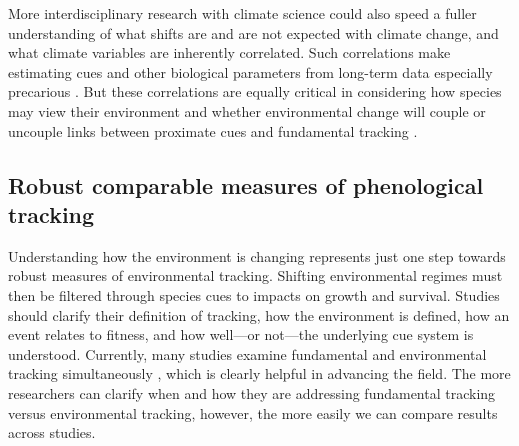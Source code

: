 \documentclass[11pt,letterpaper]{article}
\begin{document}
More interdisciplinary research with climate science could also speed a fuller understanding of what shifts are and are not expected with climate change, and what climate variables are inherently correlated. Such correlations make estimating cues and other biological parameters from long-term data especially precarious \citep{tansey2017}. But these correlations are equally critical in considering how species may view their environment and whether environmental change will couple or uncouple links between proximate cues and fundamental tracking \citep{bonamour2019}. 

\subsection{Robust comparable measures of phenological tracking} 

Understanding how the environment is changing represents just one step towards robust measures of environmental tracking. Shifting environmental regimes must then be filtered through species cues to impacts on growth and survival. Studies should clarify their definition of tracking, how the environment is defined, how an event relates to fitness, and how well---or not---the underlying cue system is understood. Currently, many studies examine fundamental and environmental tracking simultaneously \citep[e.g.,][]{visser2006,charm2008,Cleland:2012,yang2020}, which is clearly helpful in advancing the field. The more researchers can clarify when and how they are addressing fundamental tracking versus environmental tracking, however, the more easily we can compare results across studies. 
\end{document}

